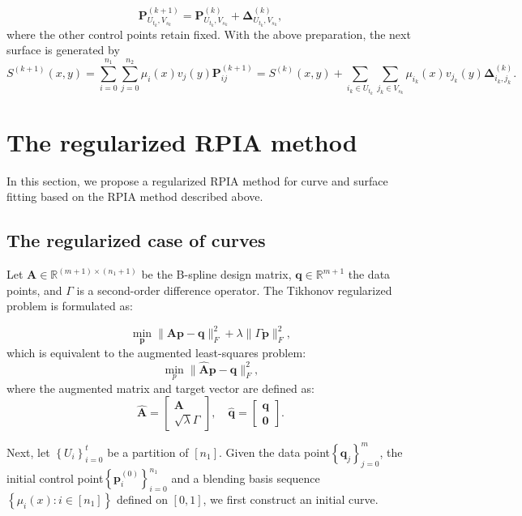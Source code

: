 \documentclass[11pt]{article}
\numberwithin{equation}{section}
\begin{document}
\begin{equation*}
\boldsymbol{P}_{U_{t_{k}}, V_{s_{k}}}^{(k+1)}=\boldsymbol{P}_{U_{t_{k}}, V_{s_{k}}}^{(k)}+\boldsymbol{\Delta}_{U_{t_{k}}, V_{s_{k}}}^{(k)}, 
\end{equation*}
where the other control points retain fixed. With the above preparation, the next surface is generated by
$$
{S}^{(k+1)}(x, y)=\sum_{i=0}^{n_{1}} \sum_{j=0}^{n_{2}} \mu_{i}(x) v_{j}(y) \boldsymbol{P}_{i j}^{(k+1)}=S^{(k)}(x, y)+\sum_{i_{k} \in U_{t_{k}}} \sum_{j_{k} \in V_{s_{k}}} \mu_{i_{k}}(x) v_{j_{k}}(y) \boldsymbol\Delta_{i_{k}, j_{k}}^{(k)}.
$$
\section{The regularized RPIA method}
In this section, we propose a regularized RPIA method for curve and surface fitting based on the RPIA method described above.

\subsection{The regularized case of curves}
Let $\boldsymbol{A} \in \mathbb{R}^{(m+1) \times\left(n_1+1\right)}$ be the B-spline design matrix, $\boldsymbol{q} \in \mathbb{R}^{m+1}$ the data points, and $\Gamma$ is a second-order difference operator. The Tikhonov regularized problem is formulated as:

\begin{equation*}
\min _{\boldsymbol{p}}\|\boldsymbol{A} \boldsymbol{p}-\boldsymbol{q}\|_F^2+\lambda\|\Gamma \boldsymbol{p}\|_F^2, 
\end{equation*}
which is equivalent to the augmented least-squares problem:
$$
\min _p\|\hat{\boldsymbol{A}} \boldsymbol{p}-\hat{\boldsymbol{q}}\|_F^2,
$$
where the augmented matrix and target vector are defined as:
$$
\hat{\boldsymbol{A}}=\left[\begin{array}{c}
\boldsymbol{A} \\
\sqrt{\lambda} \Gamma
\end{array}\right], \quad \hat{\boldsymbol{q}}=\left[\begin{array}{l}
\boldsymbol{q} \\
\mathbf{0}
\end{array}\right].
$$

Next, let $\left\{U_i\right\}_{i=0}^t$ be a partition of $\left[n_1\right]$. Given the data point$\left\{\boldsymbol{q}_{j}\right\}_{j=0}^{m}$, the initial control point$\left\{\boldsymbol{p}_{i}^{(0)}\right\}_{i=0}^{n_{1}}$ and a blending basis sequence $\left\{\mu_i(x): i \in\left[n_1\right]\right\}$ defined on $[0,1]$, we first construct an initial curve.
\end{document}
